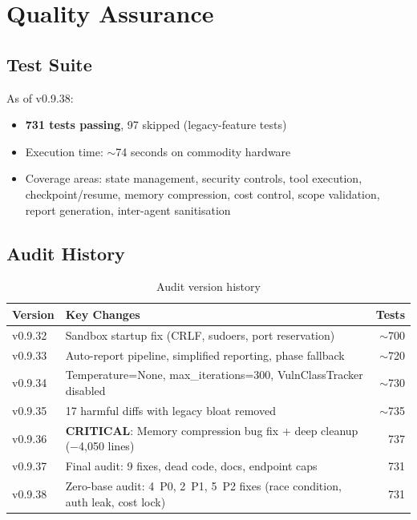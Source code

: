 \documentclass[11pt,a4paper]{article}
\begin{document}
\section{Quality Assurance}
\label{sec:qa}

\subsection{Test Suite}
As of v0.9.38:
\begin{itemize}[noitemsep]
  \item \textbf{731 tests passing}, 97 skipped (legacy-feature tests)
  \item Execution time: $\sim$74 seconds on commodity hardware
  \item Coverage areas: state management, security controls, tool execution,
        checkpoint/resume, memory compression, cost control, scope validation,
        report generation, inter-agent sanitisation
\end{itemize}

\subsection{Audit History}
\begin{table}[H]
\centering
\caption{Audit version history}
\label{tab:audit}
\begin{tabular}{lp{8cm}r}
\toprule
\textbf{Version} & \textbf{Key Changes} & \textbf{Tests} \\
\midrule
v0.9.32 & Sandbox startup fix (CRLF, sudoers, port reservation) & $\sim$700 \\
v0.9.33 & Auto-report pipeline, simplified reporting, phase fallback & $\sim$720 \\
v0.9.34 & Temperature=None, max\_iterations=300, VulnClassTracker disabled & $\sim$730 \\
v0.9.35 & 17 harmful diffs with legacy bloat removed & $\sim$735 \\
v0.9.36 & \textbf{CRITICAL}: Memory compression bug fix + deep cleanup ($-$4{,}050 lines) & 737 \\
v0.9.37 & Final audit: 9 fixes, dead code, docs, endpoint caps & 731 \\
v0.9.38 & Zero-base audit: 4~P0, 2~P1, 5~P2 fixes (race condition, auth leak, cost lock) & 731 \\
\bottomrule
\end{tabular}
\end{table}
\end{document}
